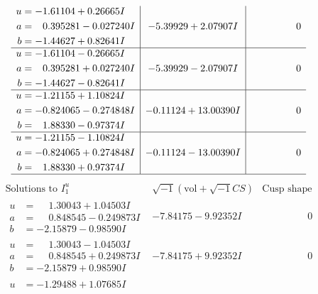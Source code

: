 \documentclass[1p]{elsarticle_modified}
\theoremstyle{definition}
\newcommand{\I}{\sqrt{-1}}
\begin{document}
$$\begin{array}{c|c|c}
\begin{aligned}
u &= -1.61104 + 0.26665 I \\
a &= \phantom{-}0.395281 - 0.027240 I \\
b &= -1.44627 + 0.82641 I\end{aligned}
 & -5.39929 + 2.07907 I & \phantom{-0.000000 } 0 \\ \hline\begin{aligned}
u &= -1.61104 - 0.26665 I \\
a &= \phantom{-}0.395281 + 0.027240 I \\
b &= -1.44627 - 0.82641 I\end{aligned}
 & -5.39929 - 2.07907 I & \phantom{-0.000000 } 0 \\ \hline\begin{aligned}
u &= -1.21155 + 1.10824 I \\
a &= -0.824065 - 0.274848 I \\
b &= \phantom{-}1.88330 - 0.97374 I\end{aligned}
 & -0.11124 + 13.00390 I & \phantom{-0.000000 } 0 \\ \hline\begin{aligned}
u &= -1.21155 - 1.10824 I \\
a &= -0.824065 + 0.274848 I \\
b &= \phantom{-}1.88330 + 0.97374 I\end{aligned}
 & -0.11124 - 13.00390 I & \phantom{-0.000000 } 0\\
 \hline 
 \end{array}$$\newpage$$\begin{array}{c|c|c}  
\text{Solutions to }I^u_{1}& \I (\text{vol} + \sqrt{-1}CS) & \text{Cusp shape}\\
 \hline 
\begin{aligned}
u &= \phantom{-}1.30043 + 1.04503 I \\
a &= \phantom{-}0.848545 - 0.249873 I \\
b &= -2.15879 - 0.98590 I\end{aligned}
 & -7.84175 - 9.92352 I & \phantom{-0.000000 } 0 \\ \hline\begin{aligned}
u &= \phantom{-}1.30043 - 1.04503 I \\
a &= \phantom{-}0.848545 + 0.249873 I \\
b &= -2.15879 + 0.98590 I\end{aligned}
 & -7.84175 + 9.92352 I & \phantom{-0.000000 } 0 \\ \hline\begin{aligned}
u &= -1.29488 + 1.07685 I \\

\end{aligned}
\end{array}$$
\end{document}
